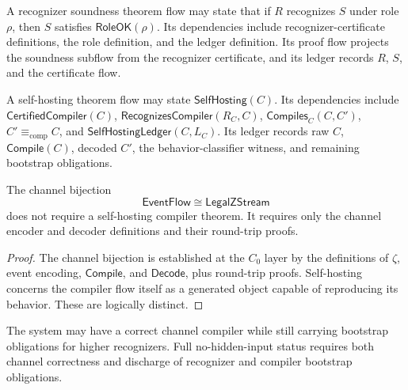 \begin{example}
\label{ex:self-hosting-compiler-recognizer-soundness-theorem}
A recognizer soundness theorem flow may state that if $R$ recognizes $S$ under role $\rho$, then $S$ satisfies $\mathsf{RoleOK}(\rho)$. Its dependencies include recognizer-certificate definitions, the role definition, and the ledger definition. Its proof flow projects the soundness subflow from the recognizer certificate, and its ledger records $R$, $S$, and the certificate flow.
\end{example}

\begin{example}
\label{ex:self-hosting-compiler-self-hosting-theorem}
A self-hosting theorem flow may state $\mathsf{SelfHosting}(C)$. Its dependencies include $\mathsf{CertifiedCompiler}(C)$, $\mathsf{RecognizesCompiler}(R_C,C)$, $\mathsf{Compiles}_C(C,C')$, $C'\equiv_{\mathrm{comp}}C$, and $\mathsf{SelfHostingLedger}(C,L_C)$. Its ledger records raw $C$, $\mathsf{Compile}(C)$, decoded $C'$, the behavior-classifier witness, and remaining bootstrap obligations.
\end{example}

\begin{theorem}
\label{thm:self-hosting-compiler-channel-bijection-independent}
The channel bijection
$$
  \mathsf{EventFlow}\cong\mathsf{LegalZStream}
$$
does not require a self-hosting compiler theorem. It requires only the channel encoder and decoder definitions and their round-trip proofs.
\end{theorem}

\begin{proof}
The channel bijection is established at the $C_0$ layer by the definitions of $\zeta$, event encoding, $\mathsf{Compile}$, and $\mathsf{Decode}$, plus round-trip proofs. Self-hosting concerns the compiler flow itself as a generated object capable of reproducing its behavior. These are logically distinct.
\end{proof}

\begin{corollary}
\label{cor:self-hosting-compiler-channel-correctness-separate}
The system may have a correct channel compiler while still carrying bootstrap obligations for higher recognizers. Full no-hidden-input status requires both channel correctness and discharge of recognizer and compiler bootstrap obligations.
\end{corollary}

